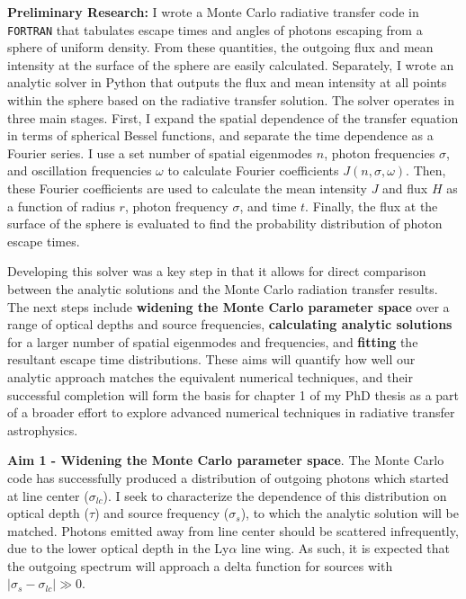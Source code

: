 \documentclass[11pt]{article}
\begin{document}
\textbf{Preliminary Research:} I wrote a Monte Carlo radiative transfer code in \texttt{FORTRAN} that tabulates escape times and angles of photons escaping from a sphere of uniform density. From these quantities, the outgoing flux and mean intensity at the surface of the sphere are easily calculated. Separately, I wrote an analytic solver in Python that outputs the flux and mean intensity at all points within the sphere based on the radiative transfer solution. The solver operates in three main stages. First, I expand the spatial dependence of the transfer equation in terms of spherical Bessel functions, and separate the time dependence as a Fourier series. I use a set number of spatial eigenmodes $n$, photon frequencies $\sigma$, and oscillation frequencies $\omega$ to calculate Fourier coefficients $J(n, \sigma, \omega)$. Then, these Fourier coefficients are used to calculate the mean intensity $J$ and flux $H$ as a function of radius $r$, photon frequency $\sigma$, and time $t$. Finally, the flux at the surface of the sphere is evaluated to find the probability distribution of photon escape times.

Developing this solver was a key step in that it allows for direct comparison between the analytic solutions and the Monte Carlo radiation transfer results. The next steps include \textbf{widening the Monte Carlo parameter space} over a range of optical depths and source frequencies, \textbf{calculating analytic solutions} for a larger number of spatial eigenmodes and frequencies, and \textbf{fitting} the resultant escape time distributions. These aims will quantify how well our analytic approach matches the equivalent numerical techniques, and their successful completion will form the basis for chapter 1 of my PhD thesis as a part of a broader effort to explore advanced numerical techniques in radiative transfer astrophysics.

\noindent \textbf{Aim 1 - Widening the Monte Carlo parameter space}. The Monte Carlo code has successfully produced a distribution of outgoing photons which started at line center ($\sigma_{lc}$). I seek to characterize the dependence of this distribution on optical depth ($\tau$) and source frequency ($\sigma_s$), to which the analytic solution will be matched. Photons emitted away from line center should be scattered infrequently, due to the lower optical depth in the Ly$\alpha$ line wing. As such, it is expected that the outgoing spectrum will approach a delta function for sources with $|\sigma_{s} - \sigma_{lc}| \gg 0$.
\end{document}
